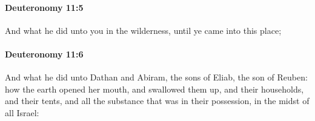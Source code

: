		\paragraph{Deuteronomy 11:5} %
			\label{DEUTERONOMY-11-5}

			And what he did unto you in the wilderness, until ye came into this place;


		\paragraph{Deuteronomy 11:6} %
			\label{DEUTERONOMY-11-6}

			And what he did unto Dathan and Abiram, the sons of Eliab, the son of Reuben: how the earth opened her mouth, and swallowed them up, and their households, and their tents, and all the substance that was in their possession, in the midst of all Israel:


